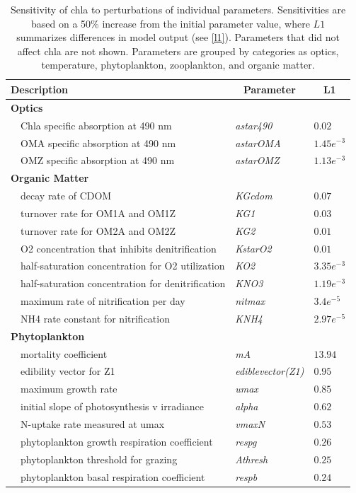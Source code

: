 \documentclass[review]{elsarticle}\usepackage[]{graphicx}\usepackage[]{color}
\begin{document}
\begin{table}[!tbp]
{\footnotesize
\caption{Sensitivity of \ac{chla} to perturbations of individual parameters.  Sensitivities are based on a 50\% increase from the initial parameter value, where $L1$ summarizes differences in model output (see \cref{l1}).  Parameters that did not affect \ac{chla} are not shown.  Parameters are grouped by categories as optics, temperature, phytoplankton, zooplankton, and organic matter.\label{tab:chlsens}} 
\begin{center}
\begin{tabular}{lll}
\hline\hline
\multicolumn{1}{l}{Description}&\multicolumn{1}{c}{Parameter}&\multicolumn{1}{c}{L1}\tabularnewline
\hline
{\bfseries Optics}&&\tabularnewline
~~Chla specific absorption at 490 nm&\textit{astar490}&$0.02$\tabularnewline
~~OMA specific absorption at 490 nm&\textit{astarOMA}&$1.45e^{-3}$\tabularnewline
~~OMZ specific absorption at 490 nm&\textit{astarOMZ}&$1.13e^{-3}$\tabularnewline
\hline
{\bfseries Organic Matter}&&\tabularnewline
~~decay rate of CDOM&\textit{KGcdom}&$0.07$\tabularnewline
~~turnover rate for OM1A and OM1Z&\textit{KG1}&$0.03$\tabularnewline
~~turnover rate for OM2A and OM2Z&\textit{KG2}&$0.01$\tabularnewline
~~O2 concentration that inhibits denitrification&\textit{KstarO2}&$0.01$\tabularnewline
~~half-saturation concentration for O2 utilization&\textit{KO2}&$3.35e^{-3}$\tabularnewline
~~half-saturation concentration for denitrification&\textit{KNO3}&$1.19e^{-3}$\tabularnewline
~~maximum rate of nitrification per day&\textit{nitmax}&$3.4e^{-5}$\tabularnewline
~~NH4 rate constant for nitrification&\textit{KNH4}&$2.97e^{-5}$\tabularnewline
\hline
{\bfseries Phytoplankton}&&\tabularnewline
~~mortality coefficient&\textit{mA}&$13.94$\tabularnewline
~~edibility vector for Z1&\textit{ediblevector(Z1)}&$0.95$\tabularnewline
~~maximum growth rate&\textit{umax}&$0.85$\tabularnewline
~~initial slope of photosynthesis v irradiance&\textit{alpha}&$0.62$\tabularnewline
~~N-uptake rate measured at umax&\textit{vmaxN}&$0.53$\tabularnewline
~~phytoplankton growth respiration coefficient&\textit{respg}&$0.26$\tabularnewline
~~phytoplankton threshold for grazing&\textit{Athresh}&$0.25$\tabularnewline
~~phytoplankton basal respiration coefficient&\textit{respb}&$0.24$\tabularnewline

\end{tabular}
\end{center}}
\end{table}
\end{document}
